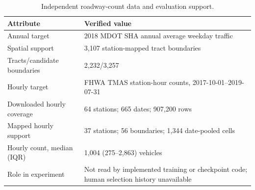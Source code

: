 \begin{table}[!htbp]
\caption{Independent roadway-count data and evaluation support.}
\label{tab:trafficdata}
\centering
\begin{tabularx}{\textwidth}{P{0.32\textwidth}Y}
\toprule
\textbf{Attribute} & \textbf{Verified value} \\
\midrule
Annual target & 2018 MDOT SHA annual average weekday traffic \\
Spatial support & 3,107 station-mapped tract boundaries \\
Tracts/candidate boundaries & 2,232/3,257 \\
Hourly target & FHWA TMAS station-hour counts, 2017-10-01--2019-07-31 \\
Downloaded hourly coverage & 64 stations; 665 dates; 907,200 rows \\
Mapped hourly support & 37 stations; 56 boundaries; 1,344 date-pooled cells \\
Hourly count, median (IQR) & 1,004 (275--2,863) vehicles \\
Role in experiment & Not read by implemented training or checkpoint code; human selection history unavailable \\
\bottomrule
\end{tabularx}
\end{table}
